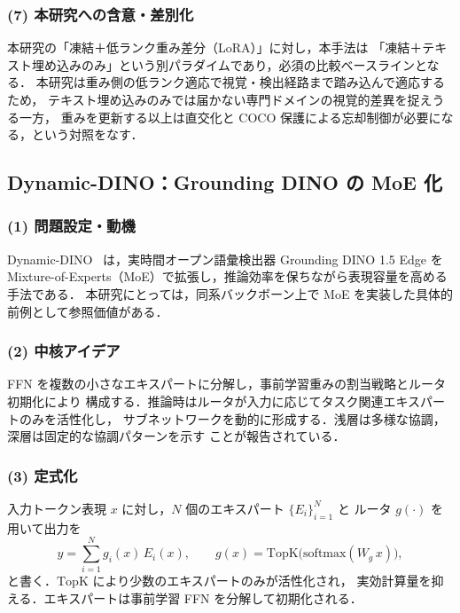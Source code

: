 \subsubsection*{(7) 本研究への含意・差別化}
本研究の「凍結＋低ランク重み差分（LoRA）」に対し，本手法は
「凍結＋テキスト埋め込みのみ」という別パラダイムであり，必須の比較ベースラインとなる．
本研究は重み側の低ランク適応で視覚・検出経路まで踏み込んで適応するため，
テキスト埋め込みのみでは届かない専門ドメインの視覚的差異を捉えうる一方，
重みを更新する以上は直交化と COCO 保護による忘却制御が必要になる，という対照をなす．

\subsection{Dynamic-DINO：Grounding DINO の MoE 化}
\label{sub:dynamicdino}

\subsubsection*{(1) 問題設定・動機}
Dynamic-DINO~\cite{dynamicdino} は，実時間オープン語彙検出器 Grounding DINO 1.5 Edge を
Mixture-of-Experts（MoE）で拡張し，推論効率を保ちながら表現容量を高める手法である．
本研究にとっては，同系バックボーン上で MoE を実装した具体的前例として参照価値がある．

\subsubsection*{(2) 中核アイデア}
FFN を複数の小さなエキスパートに分解し，事前学習重みの割当戦略とルータ初期化により
構成する．推論時はルータが入力に応じてタスク関連エキスパートのみを活性化し，
サブネットワークを動的に形成する．浅層は多様な協調，深層は固定的な協調パターンを示す
ことが報告されている．

\subsubsection*{(3) 定式化}
入力トークン表現 $x$ に対し，$N$ 個のエキスパート $\{E_i\}_{i=1}^{N}$ と
ルータ $g(\cdot)$ を用いて出力を
\begin{equation}
y = \sum_{i=1}^{N} g_i(x)\,E_i(x),\qquad
g(x) = \mathrm{TopK}\bigl(\mathrm{softmax}(W_g\,x)\bigr),
\label{eq:moe}
\end{equation}
と書く．$\mathrm{TopK}$ により少数のエキスパートのみが活性化され，
実効計算量を抑える．エキスパートは事前学習 FFN を分解して初期化される．

